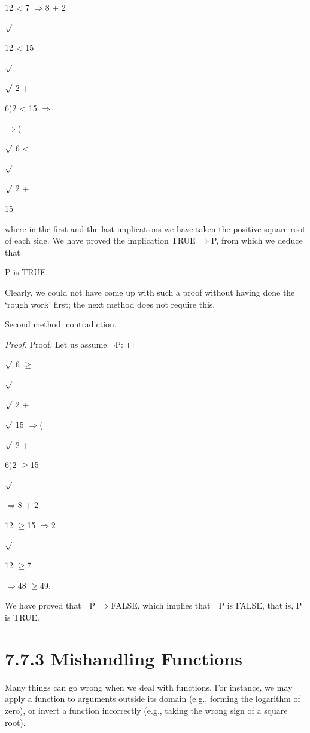 \documentclass[11pt]{article}
\theoremstyle{plain}
\theoremstyle{definition}
\begin{document}
12 < 7 $\Rightarrow$8 + 2

$\surd$

12 < 15

$\surd$

$\surd$ 2 +

6)2 < 15 $\Rightarrow$

$\Rightarrow$(

$\surd$ 6 <

$\surd$

$\surd$ 2 +

15

where in the first and the last implications we have taken the positive square root of each side. We have proved the implication TRUE $\Rightarrow$P, from which we deduce that

P is TRUE. 

Clearly, we could not have come up with such a proof without having done the `rough work' first; the next method does not require this.

Second method: contradiction.

\begin{proof}
Proof. Let us assume $\neg$P:
\end{proof}

$\surd$ 6 $\geq$

$\surd$

$\surd$ 2 +

$\surd$ 15 $\Rightarrow$(

$\surd$ 2 +

6)2 $\geq$15

$\surd$

$\Rightarrow$8 + 2

12 $\geq$15 $\Rightarrow$2

$\surd$

12 $\geq$7

$\Rightarrow$48 $\geq$49.

We have proved that $\neg$P $\Rightarrow$FALSE, which implies that $\neg$P is FALSE, that is, P is TRUE. 

\section{7.7.3 Mishandling Functions}

Many things can go wrong when we deal with functions. For instance, we may apply a function to arguments outside its domain (e.g., forming the logarithm of zero), or invert a function incorrectly (e.g., taking the wrong sign of a square root).
\end{document}
